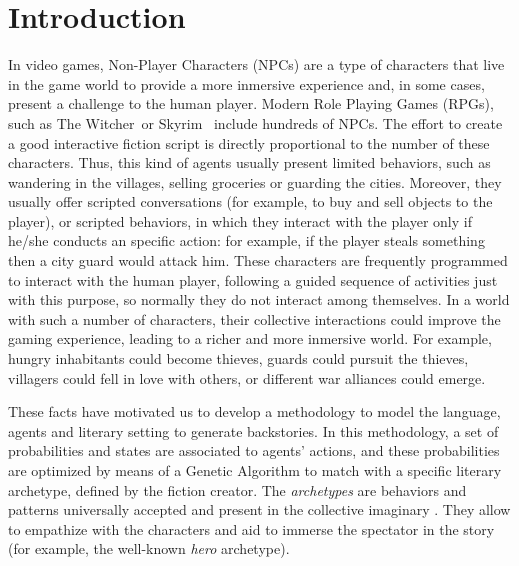 \documentclass[letterpaper]{article}
\begin{document}
%
%
\section{Introduction}
\label{sec:intro}

In video games, Non-Player Characters (NPCs)  are a type of characters
that live in the game world to provide a more inmersive
experience and, in some cases, present a challenge to the human player. Modern  Role Playing Games (RPGs), such as The
Witcher\texttrademark~or Skyrim\texttrademark~ include hundreds of NPCs. The effort to create a good interactive fiction script is directly proportional to the number of these characters. Thus, this kind of agents usually present limited behaviors, such as wandering in the villages, selling groceries or guarding the cities. Moreover, they usually offer scripted conversations (for example, to buy and sell objects to the player), or scripted behaviors, in which they interact with the player only if he/she conducts an specific action: for example, if the player steals something then a city guard would attack him. These characters are frequently programmed to interact with the human player, following a guided sequence of activities just with this purpose, so normally they do not interact among themselves. In a world with such a number of characters, their collective interactions could improve the gaming experience, leading to a richer and more inmersive world. For example, hungry inhabitants could become thieves, guards could pursuit the thieves, villagers could fell in love with others, or different war alliances could emerge.


These facts have motivated us to develop a methodology to model the language, agents and literary setting to generate backstories. In this methodology, a set of probabilities and 
states are associated to agents' actions, and these probabilities are
optimized by means of a Genetic Algorithm to match with a
specific literary archetype, defined by the fiction creator. The {\em
archetypes} are behaviors and patterns universally accepted and
present in the collective imaginary
 \cite{ArchetypesGarry05}. They allow to empathize  %
with the characters and aid to immerse the spectator in the story
(for example, the well-known {\em hero} archetype).
\end{document}
